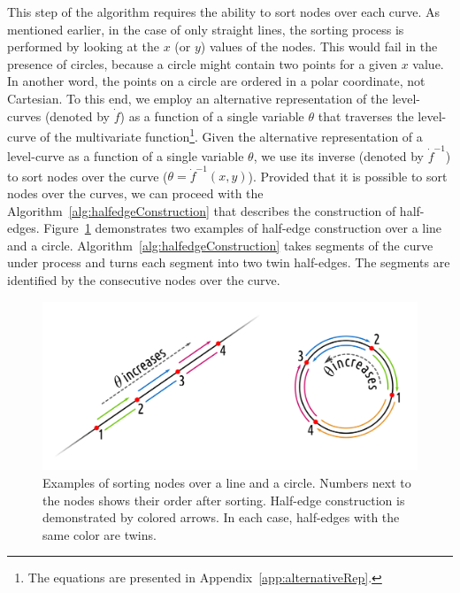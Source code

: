 This step of the algorithm requires the ability to sort nodes over each curve.
As mentioned earlier, in the case of only straight lines, the sorting process is performed by looking at the $x$ (or $y$) values of the nodes.
This would fail in the presence of circles, because a circle might contain two points for a given $x$ value.
In another word, the points on a circle are ordered in a polar coordinate, not Cartesian.
To this end, we employ an alternative representation of the level-curves (denoted by $\dot{f}$) as a function of a single variable $\theta$ that traverses the level-curve of the multivariate function\footnote{The equations are presented in Appendix~\ref{app:alternativeRep}.}.
Given the alternative representation of a level-curve as a function of a single variable $\theta$, we use its inverse (denoted by $\dot{f}^{-1}$) to sort nodes over the curve ($\theta = \dot{f}^{-1}(x,y)$).
Provided that it is possible to sort nodes over the curves, we can proceed with the Algorithm~\ref{alg:halfedgeConstruction} that describes the construction of half-edges.
Figure~\ref{fig:subd_heConstruct} demonstrates two examples of half-edge construction over a line and a circle.
Algorithm~\ref{alg:halfedgeConstruction} takes segments of the curve under process and turns each segment into two twin half-edges.
The segments are identified by the consecutive nodes over the curve.

\begin{figure}
    \centering
    \includegraphics[width=.8\textwidth]{figures/subd_heConstruct.png}
    \caption{Examples of sorting nodes over a line and a circle.
      Numbers next to the nodes shows their order after sorting.
      Half-edge construction is demonstrated by colored arrows.
      In each case, half-edges with the same color are twins.}
    \label{fig:subd_heConstruct}
\end{figure}

